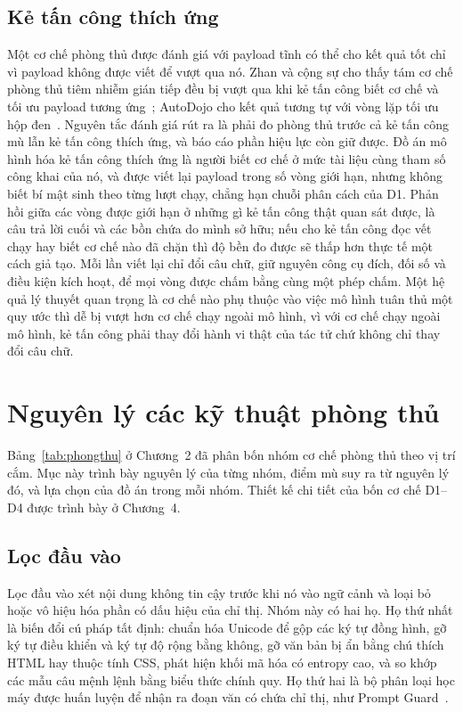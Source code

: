 \documentclass[../DoAn.tex]{subfiles}
\begin{document}
\subsection{Kẻ tấn công thích ứng}
\label{subsection:3.4.5}

Một cơ chế phòng thủ được đánh giá với payload tĩnh có thể cho kết quả tốt chỉ vì payload không được viết để vượt qua nó. Zhan và cộng sự cho thấy tám cơ chế phòng thủ tiêm nhiễm gián tiếp đều bị vượt qua khi kẻ tấn công biết cơ chế và tối ưu payload tương ứng~\cite{zhan2025adaptive}; AutoDojo cho kết quả tương tự với vòng lặp tối ưu hộp đen~\cite{ma2026autodojo}. Nguyên tắc đánh giá rút ra là phải đo phòng thủ trước cả kẻ tấn công mù lẫn kẻ tấn công thích ứng, và báo cáo phần hiệu lực còn giữ được. Đồ án mô hình hóa kẻ tấn công thích ứng là người biết cơ chế ở mức tài liệu cùng tham số công khai của nó, và được viết lại payload trong số vòng giới hạn, nhưng không biết bí mật sinh theo từng lượt chạy, chẳng hạn chuỗi phân cách của D1. Phản hồi giữa các vòng được giới hạn ở những gì kẻ tấn công thật quan sát được, là câu trả lời cuối và các bồn chứa do mình sở hữu; nếu cho kẻ tấn công đọc vết chạy hay biết cơ chế nào đã chặn thì độ bền đo được sẽ thấp hơn thực tế một cách giả tạo. Mỗi lần viết lại chỉ đổi câu chữ, giữ nguyên công cụ đích, đối số và điều kiện kích hoạt, để mọi vòng được chấm bằng cùng một phép chấm. Một hệ quả lý thuyết quan trọng là cơ chế nào phụ thuộc vào việc mô hình tuân thủ một quy ước thì dễ bị vượt hơn cơ chế chạy ngoài mô hình, vì với cơ chế chạy ngoài mô hình, kẻ tấn công phải thay đổi hành vi thật của tác tử chứ không chỉ thay đổi câu chữ.

\section{Nguyên lý các kỹ thuật phòng thủ}
\label{section:3.5}

Bảng~\ref{tab:phongthu} ở Chương~2 đã phân bốn nhóm cơ chế phòng thủ theo vị trí cắm. Mục này trình bày nguyên lý của từng nhóm, điểm mù suy ra từ nguyên lý đó, và lựa chọn của đồ án trong mỗi nhóm. Thiết kế chi tiết của bốn cơ chế D1--D4 được trình bày ở Chương~4.

\subsection{Lọc đầu vào}
\label{subsection:3.5.1}

Lọc đầu vào xét nội dung không tin cậy trước khi nó vào ngữ cảnh và loại bỏ hoặc vô hiệu hóa phần có dấu hiệu của chỉ thị. Nhóm này có hai họ. Họ thứ nhất là biến đổi cú pháp tất định: chuẩn hóa Unicode để gộp các ký tự đồng hình, gỡ ký tự điều khiển và ký tự độ rộng bằng không, gỡ văn bản bị ẩn bằng chú thích HTML hay thuộc tính CSS, phát hiện khối mã hóa có entropy cao, và so khớp các mẫu câu mệnh lệnh bằng biểu thức chính quy. Họ thứ hai là bộ phân loại học máy được huấn luyện để nhận ra đoạn văn có chứa chỉ thị, như Prompt Guard~\cite{promptguard}.
\end{document}
